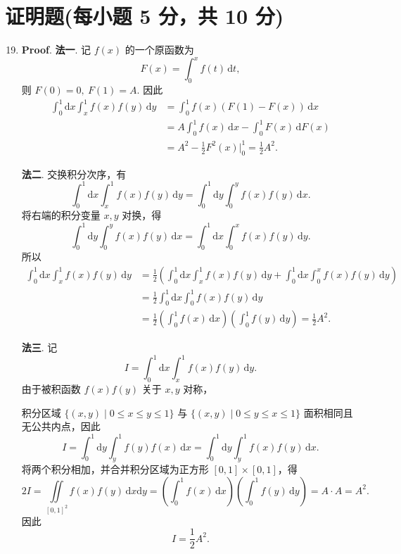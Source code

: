 \documentclass[../main.tex]{subfiles}
\begin{document}
\section{证明题(每小题 5 分，共 10 分)}
\begin{enumerate}
  \setcounter{enumi}{18}
  \item \textbf{Proof}. \textbf{法一}. 记 \(f(x)\) 的一个原函数为
        \[
          F(x)=\int_0^x f(t)\,\mathrm{d}t,
        \]
        则 \(F(0)=0,\ F(1)=A\). 因此
        \[
          \begin{aligned}
            \int_0^1\mathrm{d}x\int_x^1 f(x)f(y)\,\mathrm{d}y
             & =\int_0^1 f(x)\left(F(1)-F(x)\right)\,\mathrm{d}x          \\
             & =A\int_0^1 f(x)\,\mathrm{d}x-\int_0^1 F(x)\,\mathrm{d}F(x) \\
             & =A^2-\frac{1}{2}F^2(x)\bigg|_0^1
            =\frac{1}{2}A^2.
          \end{aligned}
        \]

        \textbf{法二}. 交换积分次序，有
        \[
          \int_0^1\mathrm{d}x\int_x^1 f(x)f(y)\,\mathrm{d}y
          =\int_0^1\mathrm{d}y\int_0^y f(x)f(y)\,\mathrm{d}x.
        \]
        将右端的积分变量 \(x,y\) 对换，得
        \[
          \int_0^1\mathrm{d}y\int_0^y f(x)f(y)\,\mathrm{d}x
          =\int_0^1\mathrm{d}x\int_0^x f(x)f(y)\,\mathrm{d}y.
        \]
        所以
        \[
          \begin{aligned}
            \int_0^1\mathrm{d}x\int_x^1 f(x)f(y)\,\mathrm{d}y
             & =\frac{1}{2}\left(\int_0^1\mathrm{d}x\int_x^1 f(x)f(y)\,\mathrm{d}y
            +\int_0^1\mathrm{d}x\int_0^x f(x)f(y)\,\mathrm{d}y\right)                                     \\
             & =\frac{1}{2}\int_0^1\mathrm{d}x\int_0^1 f(x)f(y)\,\mathrm{d}y                              \\
             & =\frac{1}{2}\left(\int_0^1 f(x)\,\mathrm{d}x\right)\left(\int_0^1 f(y)\,\mathrm{d}y\right)
            =\frac{1}{2}A^2.
          \end{aligned}
        \]

        \textbf{法三}. 记
        \[
          I = \int_0^1 \mathrm{d}x \int_x^1 f(x)f(y)\,\mathrm{d}y.
        \]
        由于被积函数 $f(x)f(y)$ 关于 $x,y$ 对称，

        积分区域 $\{(x,y)\mid 0\le x\le y\le 1\}$ 与 $\{(x,y)\mid 0\le y\le x\le 1\}$ 面积相同且无公共内点，因此
        \[
          I = \int_0^1 \mathrm{d}y \int_y^1 f(y)f(x)\,\mathrm{d}x = \int_0^1 \mathrm{d}y \int_y^1 f(x)f(y)\,\mathrm{d}x.
        \]
        将两个积分相加，并合并积分区域为正方形 $[0,1]\times[0,1]$，得
        \[
          2I = \iint\limits_{[0,1]^2} f(x)f(y)\,\mathrm{d}x\mathrm{d}y
          = \left(\int_0^1 f(x)\,\mathrm{d}x\right)\left(\int_0^1 f(y)\,\mathrm{d}y\right)
          = A \cdot A = A^2.
        \]
        因此
        \[
          I = \frac{1}{2}A^2.
        \]


\end{enumerate}
\end{document}
